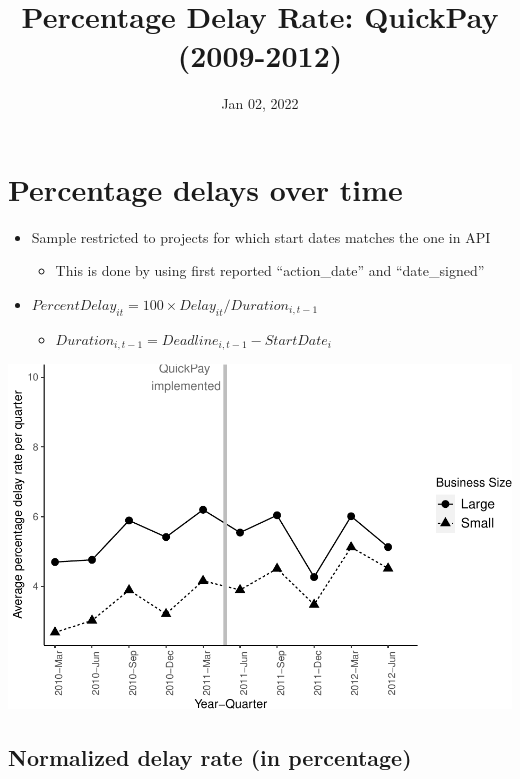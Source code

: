 \documentclass[
]{article}
\title{Percentage Delay Rate: QuickPay (2009-2012)}
\author{}
\date{\vspace{-2.5em}Jan 02, 2022}
\providecommand{\tightlist}{%
  \setlength{\itemsep}{0pt}\setlength{\parskip}{0pt}}
\begin{document}
\maketitle

\hypertarget{percentage-delays-over-time}{%
\section{Percentage delays over
time}\label{percentage-delays-over-time}}

\begin{itemize}
\tightlist
\item
  Sample restricted to projects for which start dates matches the one in
  API

  \begin{itemize}
  \tightlist
  \item
    This is done by using first reported ``action\_date'' and
    ``date\_signed''
  \end{itemize}
\item
  \(PercentDelay_{it}=100 \times Delay_{it}/Duration_{i,t-1}\)

  \begin{itemize}
  \tightlist
  \item
    \(Duration_{i,t-1} = Deadline_{i,t-1} - StartDate_i\)
  \end{itemize}
\end{itemize}

\includegraphics{qp_first_pc_delay_files/figure-latex/plot_pc_delay-1.pdf}

\hypertarget{normalized-delay-rate-in-percentage}{%
\subsection{Normalized delay rate (in
percentage)}\label{normalized-delay-rate-in-percentage}}
\end{document}
